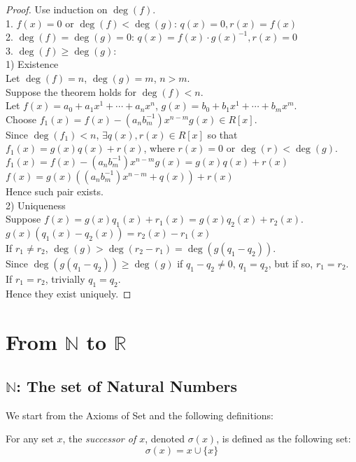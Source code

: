 \documentclass{report}
\begin{document}
		\begin{proof}
				Use induction on $\deg(f)$.\\
				1. $f(x)=0$ or $\deg(f)<\deg(g)$: $q(x)=0, r(x)=f(x)$\\
				2. $\deg(f)=\deg(g)=0$: $q(x)=f(x) \cdot g(x)^{-1}, r(x)=0$\\
				3. $\deg(f)\ge\deg(g)$:\\
				
				1) Existence\\
				Let $\deg(f)=n$, $\deg(g)=m$, $n>m$.\\
				Suppose the theorem holds for $\deg(f)<n$.\\
				Let $f(x)=a_0+a_1x^1+\cdots+a_nx^n$, $g(x)=b_0+b_1x^1+\cdots+b_mx^m$.\\
				Choose $f_1(x)=f(x)-(a_nb_m^{-1})x^{n-m}g(x)\in R[x]$.\\
				Since $\deg(f_1)<n$, $\exists q(x),r(x)\in R[x]$ so that $f_1(x)=g(x)q(x)+r(x)$, where $r(x)=0$ or $\deg(r)<\deg(g)$.\\
				$f_1(x)=f(x)-(a_nb_m^{-1})x^{n-m}g(x)=g(x)q(x)+r(x)$\\
				$f(x)=g(x)((a_nb_m^{-1})x^{n-m}+q(x))+r(x)$\\
				Hence such pair exists.\\
				
				2) Uniqueness\\
				Suppose $f(x)=g(x)q_1(x)+r_1(x)=g(x)q_2(x)+r_2(x)$.\\
				$g(x)(q_1(x)-q_2(x))=r_2(x)-r_1(x)$\\
				If $r_1 \ne r_2$, $\deg(g)>\deg(r_2-r_1)=\deg(g(q_1-q_2))$.\\
				Since $\deg(g(q_1-q_2))\ge\deg(g)$ if $q_1-q_2\ne0$, $q_1=q_2$, but if so, $r_1=r_2$.\\
				If $r_1=r_2$, trivially $q_1=q_2$.\\
				Hence they exist uniquely.
		\end{proof}
	\section{From $\mathbb{N}$ to $\mathbb{R}$}
		\subsection{$\mathbb{N}$: The set of Natural Numbers}
		We start from the Axioms of Set and the following definitions:
		
		\begin{defn}[Successor] \label{defn_successor}
			For any set $x$, the \emph{successor of $x$}, denoted $\sigma(x)$, is defined as the following set:
			\begin{displaymath}
				\sigma(x)=x \cup \{x\}
			\end{displaymath}
		\end{defn}
	
\end{document}
